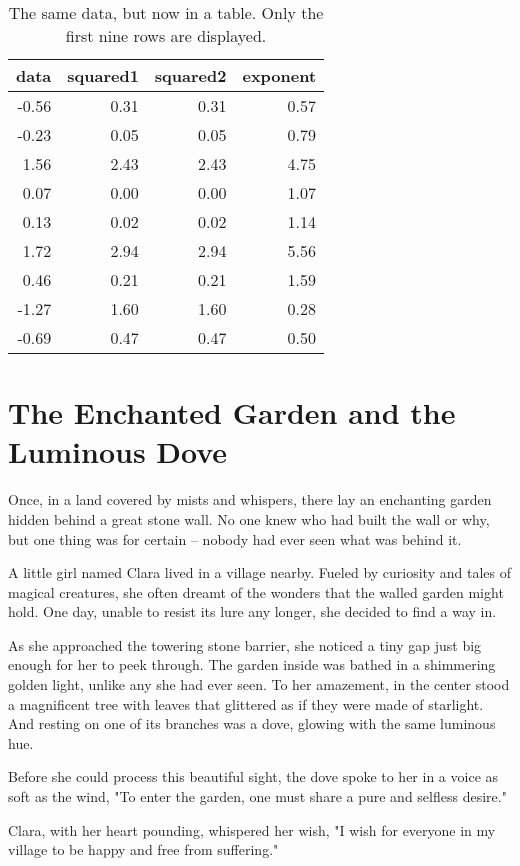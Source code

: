\documentclass[10pt, a4paper, titlepage]{article}
\begin{document}
\begin{table}[!h]
\centering
\caption{The same data, but now in a table. Only the first nine rows are displayed.} 
\begin{tabular}{rrrr}
  \hline
data & squared1 & squared2 & exponent \\ 
  \hline
-0.56 & 0.31 & 0.31 & 0.57 \\ 
  -0.23 & 0.05 & 0.05 & 0.79 \\ 
  1.56 & 2.43 & 2.43 & 4.75 \\ 
  0.07 & 0.00 & 0.00 & 1.07 \\ 
  0.13 & 0.02 & 0.02 & 1.14 \\ 
  1.72 & 2.94 & 2.94 & 5.56 \\ 
  0.46 & 0.21 & 0.21 & 1.59 \\ 
  -1.27 & 1.60 & 1.60 & 0.28 \\ 
  -0.69 & 0.47 & 0.47 & 0.50 \\ 
   \hline
\end{tabular}
\end{table}

\section{The Enchanted Garden and the Luminous Dove}

Once, in a land covered by mists and whispers, there lay an enchanting garden hidden behind a great stone wall. No one knew who had built the wall or why, but one thing was for certain – nobody had ever seen what was behind it.

A little girl named Clara lived in a village nearby. Fueled by curiosity and tales of magical creatures, she often dreamt of the wonders that the walled garden might hold. One day, unable to resist its lure any longer, she decided to find a way in.

As she approached the towering stone barrier, she noticed a tiny gap just big enough for her to peek through. The garden inside was bathed in a shimmering golden light, unlike any she had ever seen. To her amazement, in the center stood a magnificent tree with leaves that glittered as if they were made of starlight. And resting on one of its branches was a dove, glowing with the same luminous hue.

Before she could process this beautiful sight, the dove spoke to her in a voice as soft as the wind, "To enter the garden, one must share a pure and selfless desire."

Clara, with her heart pounding, whispered her wish, "I wish for everyone in my village to be happy and free from suffering."
\end{document}
